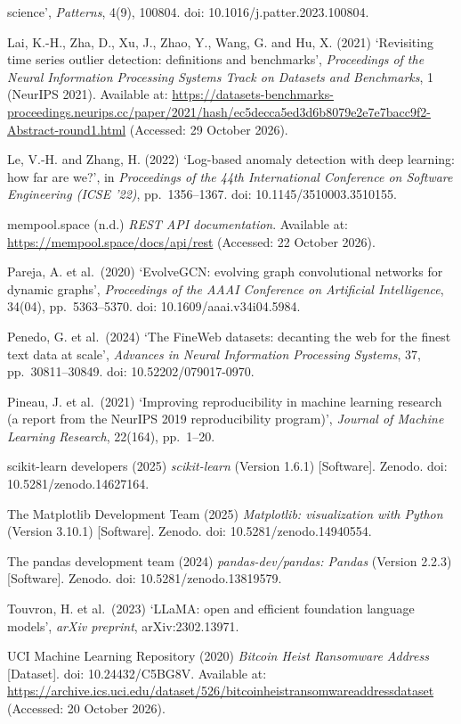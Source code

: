 \begin{references}
  science', \emph{Patterns}, 4(9), 100804. doi: 10.1016/j.patter.2023.100804.
\item Lai, K.-H., Zha, D., Xu, J., Zhao, Y., Wang, G. and Hu, X. (2021) `Revisiting time series outlier
  detection: definitions and benchmarks', \emph{Proceedings of the Neural Information Processing Systems Track on
  Datasets and Benchmarks}, 1 (NeurIPS 2021). Available at:
  \url{https://datasets-benchmarks-proceedings.neurips.cc/paper/2021/hash/ec5decca5ed3d6b8079e2e7e7bacc9f2-Abstract-round1.html}
  (Accessed: 29 October 2026).
\item Le, V.-H. and Zhang, H. (2022) `Log-based anomaly detection with deep learning: how far are we?', in
  \emph{Proceedings of the 44th International Conference on Software Engineering (ICSE '22)}, pp.\ 1356--1367.
  doi: 10.1145/3510003.3510155.
\item mempool.space (n.d.) \emph{REST API documentation}. Available at: \url{https://mempool.space/docs/api/rest}
  (Accessed: 22 October 2026).
\item Pareja, A. et al.\ (2020) `EvolveGCN: evolving graph convolutional networks for dynamic graphs',
  \emph{Proceedings of the AAAI Conference on Artificial Intelligence}, 34(04), pp.\ 5363--5370.
  doi: 10.1609/aaai.v34i04.5984.
\item Penedo, G. et al.\ (2024) `The FineWeb datasets: decanting the web for the finest text data at scale',
  \emph{Advances in Neural Information Processing Systems}, 37, pp.\ 30811--30849. doi: 10.52202/079017-0970.
\item Pineau, J. et al.\ (2021) `Improving reproducibility in machine learning research (a report from the
  NeurIPS 2019 reproducibility program)', \emph{Journal of Machine Learning Research}, 22(164), pp.\ 1--20.
\item scikit-learn developers (2025) \emph{scikit-learn} (Version 1.6.1) [Software]. Zenodo.
  doi: 10.5281/zenodo.14627164.
\item The Matplotlib Development Team (2025) \emph{Matplotlib: visualization with Python} (Version 3.10.1)
  [Software]. Zenodo. doi: 10.5281/zenodo.14940554.
\item The pandas development team (2024) \emph{pandas-dev/pandas: Pandas} (Version 2.2.3) [Software]. Zenodo.
  doi: 10.5281/zenodo.13819579.
\item Touvron, H. et al.\ (2023) `LLaMA: open and efficient foundation language models', \emph{arXiv preprint},
  arXiv:2302.13971.
\item UCI Machine Learning Repository (2020) \emph{Bitcoin Heist Ransomware Address} [Dataset].
  doi: 10.24432/C5BG8V. Available at:
  \url{https://archive.ics.uci.edu/dataset/526/bitcoinheistransomwareaddressdataset} (Accessed: 20 October 2026).
\end{references}
